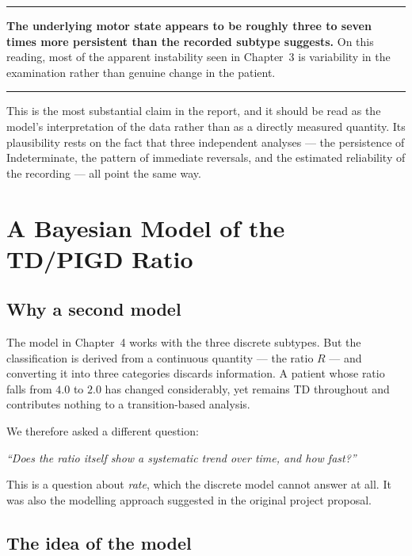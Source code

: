 \documentclass[11pt,a4paper]{article}
\newenvironment{keypoint}
  {\begin{center}\begin{minipage}{0.94\textwidth}%
   \vspace{4pt}\hrule\vspace{7pt}\small}
  {\vspace{7pt}\hrule\vspace{4pt}\end{minipage}\end{center}}
\begin{document}
\begin{keypoint}
\textbf{The underlying motor state appears to be roughly three to seven times
more persistent than the recorded subtype suggests.} On this reading, most of
the apparent instability seen in Chapter~3 is variability in the examination
rather than genuine change in the patient.
\end{keypoint}

\noindent
This is the most substantial claim in the report, and it should be read as the
model's interpretation of the data rather than as a directly measured quantity.
Its plausibility rests on the fact that three independent analyses --- the
persistence of Indeterminate, the pattern of immediate reversals, and the
estimated reliability of the recording --- all point the same way.

\section{A Bayesian Model of the TD/PIGD Ratio}
\label{sec:bayes}

\subsection{Why a second model}

The model in Chapter~4 works with the three discrete subtypes. But the
classification is derived from a continuous quantity --- the ratio $R$ --- and
converting it into three categories discards information. A patient whose ratio
falls from $4.0$ to $2.0$ has changed considerably, yet remains TD throughout
and contributes nothing to a transition-based analysis.

We therefore asked a different question:

\begin{center}
\emph{``Does the ratio itself show a systematic trend over time, and how fast?''}
\end{center}

\noindent
This is a question about \emph{rate}, which the discrete model cannot answer at
all. It was also the modelling approach suggested in the original project
proposal.

\subsection{The idea of the model}
\end{document}
